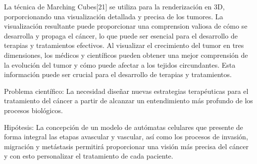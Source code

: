 La técnica de Marching Cubes[21] se utiliza para la renderización en 3D, porporcionando una visualización detallada y precisa de los tumores. La visualización resultante puede proporcionar una comprension valiosa de cómo se desarrolla y propaga el cáncer, lo que puede ser esencial para el desarrollo de terapias y tratamientos efectivos. Al visualizar el crecimiento del tumor en tres dimensiones, los médicos y científicos pueden obtener una mejor comprensión de la evolución del tumor y cómo puede afectar a los tejidos circundantes. Esta información puede ser crucial para el desarrollo de terapias y tratamientos.

\hspace{.1cm}Problema científico: La necesidad diseñar nuevas estrategias terapéuticas para el tratamiento del cáncer a partir de alcanzar un entendimiento más profundo de los procesos biológicos.

\hspace{.1cm}Hipótesis: La concepción de un modelo de autómatas celulares que presente de forma integral las etapas avascular y vascular, así como los procesos de invasión, migración y metástasis permitirá proporcionar una visión más precisa del cáncer y con esto personalizar el tratamiento de cada paciente.

